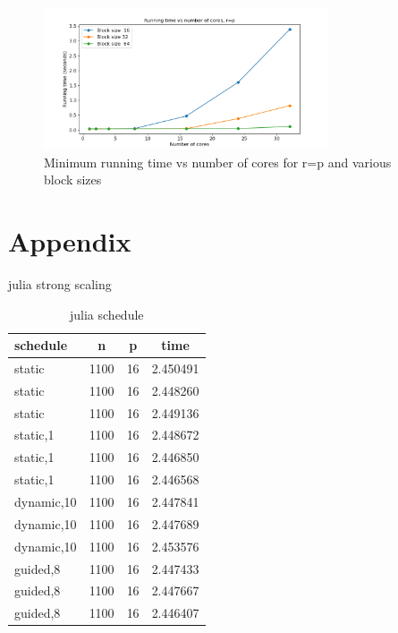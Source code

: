 \documentclass[a4paper,%
7pt,%
DIV12,
headsepline,%
headings=normal,
]{scrartcl}
\begin{document}
\begin{figure}[htbp]
    \centering
    \includegraphics[width=0.75\textwidth]{./weak_scaling_plot.png}
    \caption{Minimum running time vs number of cores for r=p and various block sizes}
    \label{fig:weak_scaling_plot}
\end{figure}

\newpage

\section{Appendix}

\begin{table}[htbp]
\centering
{}
\caption{julia strong scaling}
\label{tab:anotherlabel}
\end{table}

\begin{table}[htbp]
    \centering
    \begin{tabular}{|l|c|c|c|}
        \hline
        schedule & n & p & time \\
        \hline
        static & 1100 & 16 & 2.450491 \\
        static & 1100 & 16 & 2.448260 \\
        static & 1100 & 16 & 2.449136 \\
        static,1 & 1100 & 16 & 2.448672 \\
        static,1 & 1100 & 16 & 2.446850 \\
        static,1 & 1100 & 16 & 2.446568 \\
        dynamic,10 & 1100 & 16 & 2.447841 \\
        dynamic,10 & 1100 & 16 & 2.447689 \\
        dynamic,10 & 1100 & 16 & 2.453576 \\
        guided,8 & 1100 & 16 & 2.447433 \\
        guided,8 & 1100 & 16 & 2.447667 \\
        guided,8 & 1100 & 16 & 2.446407 \\
        \hline
    \end{tabular}
    \caption{julia schedule}
\end{table}
\end{document}
